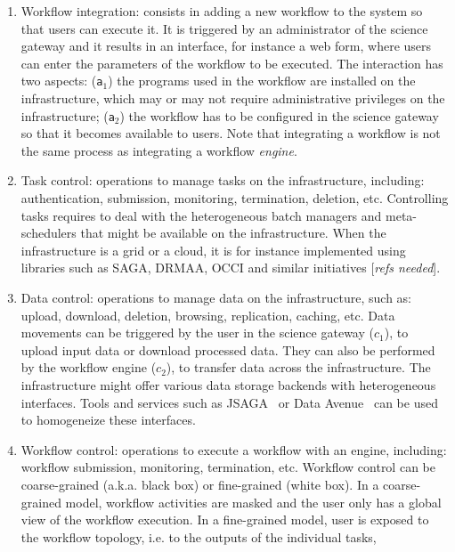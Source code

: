 \documentclass[preprint,3p,twocolumn]{elsarticle}
\newcommand{\todo}[1]{\color{blue}\xspace[\emph{#1}]\xspace\color{black}}
\begin{document}
\begin{enumerate}[leftmargin=0cm,itemindent=0.6cm,label=\texttt{(\alph*)}]

\item Workflow integration: consists in adding a new workflow to the
  system so that users can execute it. It is triggered by an
  administrator of the science gateway and it results in an interface,
  for instance a web form, where users can enter the parameters of the
  workflow to be executed. The interaction has two aspects:
  (\texttt{a$_1$}) the programs used in the workflow are installed on
  the infrastructure, which may or may not require administrative
  privileges on the infrastructure; (\texttt{a$_2$}) the workflow has
  to be configured in the science gateway so that it becomes available
  to users. Note that integrating a workflow is not the same process
  as integrating a workflow \emph{engine}.
\item Task control: operations to manage tasks on the infrastructure,
  including: authentication, submission, monitoring, termination,
  deletion, etc. Controlling tasks requires to deal with the
  heterogeneous batch managers and meta-schedulers that might be
  available on the infrastructure. When the infrastructure is a grid
  or a cloud, it is for instance implemented using libraries such as
  SAGA, DRMAA, OCCI and similar initiatives \todo{refs needed}.
\item Data control: operations to manage data on the infrastructure,
  such as: upload, download, deletion, browsing, replication, caching,
  etc. Data movements can be triggered by the user in the science
  gateway (\texttt{$c_1$}), to upload input data or download processed
  data. They can also be performed by the workflow engine
  (\texttt{$c_2$}), to transfer data across the infrastructure. The
  infrastructure might offer various data storage backends with
  heterogeneous interfaces. Tools and services such as
  JSAGA~\cite{reynaud2010uniform} or Data Avenue~\cite{hajnal2014data}
  can be used to homogeneize these interfaces.
\item Workflow control: operations to execute a workflow with an
  engine, including: workflow submission, monitoring, termination,
  etc. Workflow control can be coarse-grained (a.k.a. black box) or
  fine-grained (white box). In a coarse-grained model, workflow
  activities are masked and the user only has a global view of the
  workflow execution. In a fine-grained model, user is exposed to the
  workflow topology, i.e. to the outputs of the individual tasks,

\end{enumerate}
\end{document}
